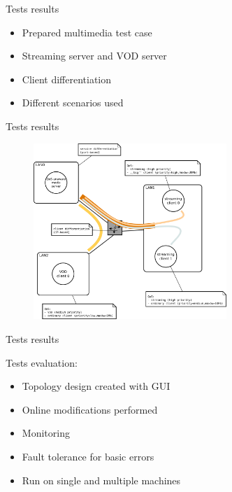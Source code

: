 \documentclass{beamer}
\begin{document}
	\begin{frame}{Tests results}

		\begin{itemize}
			\item Prepared multimedia test case
			\item Streaming server and VOD server
			\item Client differentiation
			\item Different scenarios used
		\end{itemize}

	\end{frame}

	\begin{frame}{Tests results}
		
		\begin{figure}
		   \includegraphics[width=0.65\textwidth]{img/diagram.pdf}
		\end{figure}

	\end{frame}

	\begin{frame}{Tests results}

		Tests evaluation:
		\begin{itemize}
			\item Topology design created with GUI
			\item Online modifications performed
			\item Monitoring
			\item Fault tolerance for basic errors
			\item Run on single and multiple machines
		\end{itemize}

	\end{frame}
\end{document}
